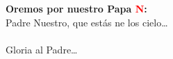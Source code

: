 \textbf{Oremos por nuestro Papa \textcolor{red}{N}:}\\
Padre Nuestro, que estás ne los cielo\ldots\\
\\
Gloria al Padre\ldots